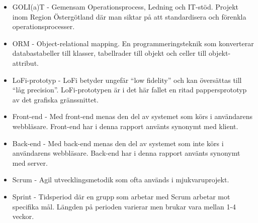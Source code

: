 \begin{itemize}

\item GOLI(a)T - Gemensam Operationsprocess, Ledning och IT-stöd. Projekt inom Region Östergötland där man siktar på att standardisera och förenkla operationsprocesser.

\item ORM - Object-relational mapping. En programmeringsteknik som konverterar databastabeller till klasser, tabellrader till objekt och celler till objekt-attribut.

\item LoFi-prototyp - LoFi betyder ungefär ``low fidelity'' och kan översättas till ``låg precision''. LoFi-prototypen är i det här fallet en ritad pappersprototyp av det grafiska gränssnittet.

\item Front-end - Med front-end menas den del av systemet som körs i användarens webbläsare. Front-end har i denna rapport använts synonymt med klient.

\item Back-end - Med back-end menas den del av systemet som inte körs i användarens webbläsare. Back-end har i denna rapport använts synonymt med server. 

\item Scrum - Agil utvecklingsmetodik som ofta används i mjukvaruprojekt.

\item Sprint - Tidsperiod där en grupp som arbetar med Scrum arbetar mot specifika mål. Längden på perioden varierar men brukar vara mellan 1-4 veckor.

\end{itemize}

\newpage
